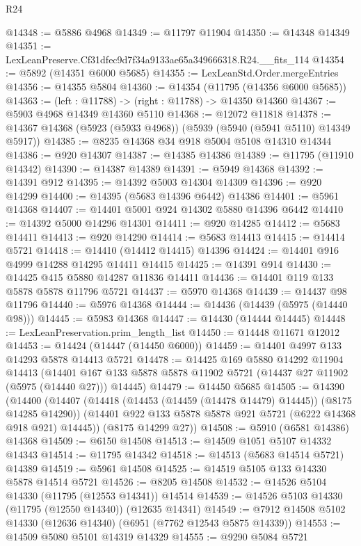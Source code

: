 \begin{lexlean}{R24}
\begin{coremodule}
@14348 := @5886 @4968
@14349 := @11797 @11904
@14350 := @14348 @14349
@14351 := LexLeanPreserve.Cf31dfec9d7f34a9133ae65a349666318.R24.__fits_114
@14354 := @5892 (@14351 @6000 @5685)
@14355 := LexLeanStd.Order.mergeEntries
@14356 := @14355 @5804
@14360 := @14354 (@11795 (@14356 @6000 @5685))
@14363 := (left : @11788) -> (right : @11788) -> @14350 @14360
@14367 := @5903 @4968 @14349 @14360 @5110
@14368 := @12072 @11818
@14378 := @14367 @14368 (@5923 (@5933 @4968)) (@5939 (@5940 (@5941 @5110) @14349 @5917))
@14385 := @8235 @14368 @34 @918 @5004 @5108 @14310 @14344
@14386 := @920 @14307
@14387 := @14385 @14386
@14389 := @11795 (@11910 @14342)
@14390 := @14387 @14389
@14391 := @5949 @14368
@14392 := @14391 @912
@14395 := @14392 @5003 @14304 @14309
@14396 := @920 @14299
@14400 := @14395 (@5683 @14396 @6442) @14386
@14401 := @5961 @14368
@14407 := @14401 @5001 @924 @14302 @5880 @14396 @6442
@14410 := @14392 @5000 @14296 @14301
@14411 := @920 @14285
@14412 := @5683 @14411
@14413 := @920 @14290
@14414 := @5683 @14413
@14415 := @14414 @5721
@14418 := @14410 (@14412 @14415) @14396
@14424 := @14401 @916 @4999 @14288 @14295 @14411 @14415
@14425 := @14391 @914
@14430 := @14425 @415 @5880 @14287 @11836 @14411
@14436 := @14401 @119 @133 @5878 @5878 @11796 @5721
@14437 := @5970 @14368
@14439 := @14437 @98 @11796
@14440 := @5976 @14368
@14444 := @14436 (@14439 (@5975 (@14440 @98)))
@14445 := @5983 @14368
@14447 := @14430 (@14444 @14445)
@14448 := LexLeanPreservation.prim_length_list
@14450 := @14448 @11671 @12012
@14453 := @14424 (@14447 (@14450 @6000))
@14459 := @14401 @4997 @133 @14293 @5878 @14413 @5721
@14478 := @14425
    @169
    @5880
    @14292
    @11904
    @14413
    (@14401 @167 @133 @5878 @5878 @11902 @5721 (@14437 @27 @11902 (@5975 (@14440 @27))) @14445)
@14479 := @14450 @5685
@14505 := @14390
    (@14400
      (@14407
        (@14418 (@14453 (@14459 (@14478 @14479) @14445)) (@8175 @14285 @14290))
        (@14401 @922 @133 @5878 @5878 @921 @5721 (@6222 @14368 @918 @921) @14445))
      (@8175 @14299 @27))
@14508 := @5910 (@6581 @14386) @14368
@14509 := @6150 @14508
@14513 := @14509 @1051 @5107 @14332 @14343
@14514 := @11795 @14342
@14518 := @14513 (@5683 @14514 @5721) @14389
@14519 := @5961 @14508
@14525 := @14519 @5105 @133 @14330 @5878 @14514 @5721
@14526 := @8205 @14508
@14532 := @14526 @5104 @14330 (@11795 (@12553 @14341)) @14514
@14539 := @14526 @5103 @14330 (@11795 (@12550 @14340)) (@12635 @14341)
@14549 := @7912 @14508 @5102 @14330 (@12636 @14340) (@6951 (@7762 @12543 @5875 @14339))
@14553 := @14509 @5080 @5101 @14319 @14329
@14555 := @9290 @5084 @5721

\end{coremodule}
\end{lexlean}
